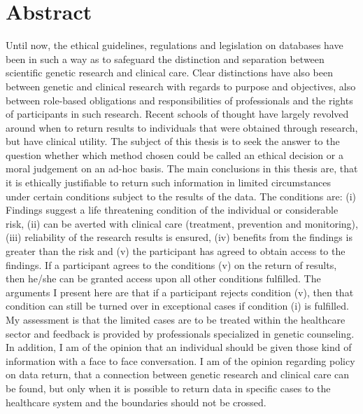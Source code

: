 \documentclass[a4paper,12pt,twoside,BCOR=10mm]{scrbook}
\begin{document}
\section*{\huge Abstract}
Until now, the ethical guidelines, regulations and legislation on databases have been in such a way as to safeguard the distinction and separation between scientific genetic research and clinical care. Clear distinctions have also been between genetic and clinical research with regards to purpose and objectives, also between role-based obligations and responsibilities of professionals and the rights of participants in such research. Recent schools of thought have largely revolved around when to return results to individuals that were obtained through research, but have clinical utility.  The subject of this thesis is to seek the answer to the question whether which method chosen could be called an ethical decision or a moral judgement on an ad-hoc basis. The main conclusions in this thesis are, that it is ethically justifiable to return such information in limited circumstances under certain conditions subject to the results of the data. The conditions are: (i) Findings suggest a life threatening condition of the individual or considerable risk, (ii) can be averted with clinical care (treatment, prevention and monitoring), (iii) reliability of the research results is ensured, (iv) benefits from the findings is greater than the risk and (v) the participant has agreed to obtain access to the findings. If a participant agrees to the conditions (v) on the return of results, then he/she can be granted access upon all other conditions fulfilled. The arguments I present here are that if a participant rejects condition (v), then that condition can still be turned over in exceptional cases if condition (i) is fulfilled. My assessment is that the limited cases are to be treated within the healthcare sector and feedback is provided by professionals specialized in genetic counseling. In addition, I am of the opinion that an individual should be given those kind of information with a face to face conversation. I am of the opinion regarding policy on data return, that a connection between genetic research and clinical care can be found, but only when it is possible to return data in specific cases to the healthcare system and the boundaries should not be crossed.
\vfill
\newpage

%
%
\tableofcontents
\renewcommand{\chaptername}{Innihald}
\end{document}

